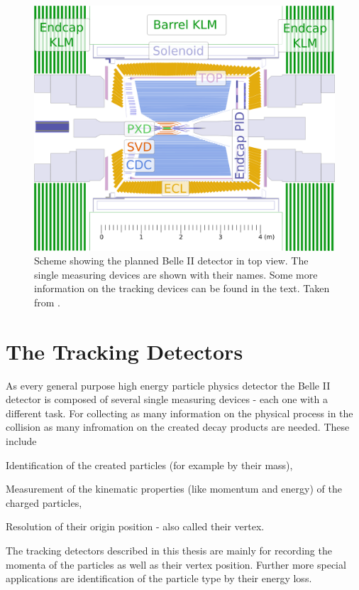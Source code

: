 \begin{figure}
 \centering
 \includegraphics[width=0.8\linewidth]{figures/experimental_setup/detector_crossection_labels.pdf}
 \caption{Scheme showing the planned Belle II detector in top view. The single measuring devices are shown with their names. Some more information on the tracking devices can be found in the text. Taken from \cite{christian}.}
 \label{fig-belle2}
\end{figure}

\section{The Tracking Detectors}

As every general purpose high energy particle physics detector the Belle II detector is composed of several single measuring devices - each one with a different task. For collecting as many information on the physical process in the collision as many infromation on the created decay products are needed. These include
\begin{zlist}
 \item Identification of the created particles (for example by their mass),
 \item Measurement of the kinematic properties (like momentum and energy) of the charged particles,
 \item Resolution of their origin position - also called their vertex.
\end{zlist}

The tracking detectors described in this thesis are mainly for recording the momenta of the particles as well as their vertex position. Further more special applications are identification of the particle type by their energy loss.

